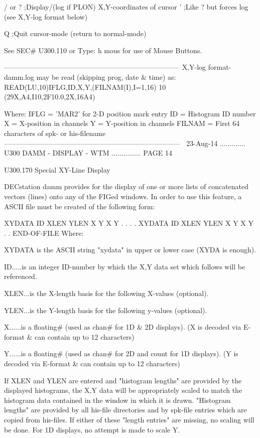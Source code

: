    / or ? ;Display/(log if PLON)  X,Y-coordinates of cursor
   '      ;Like ? but forces log (see X,Y-log format below)
 
   Q      ;Quit cursor-mode (return to normal-mode)
 
   See SEC# U300.110 or Type: h mous for use of Mouse Buttons.
 
   ---------------------------------------------------------------------------
   X,Y-log format- damm.log may be read (skipping prog, date & time) as:
          READ(LU,10)IFLG,ID,X,Y,(FILNAM(I),I=1,16)
       10 (29X,A4,I10,2F10.0,2X,16A4)
 
   Where: IFLG   = 'MAR2' for 2-D position mark entry
          ID     = Histogram ID number
          X      = X-position in channels
          Y      = Y-position in channels
          FILNAM = First 64 characters of spk- or his-filename
   ---------------------------------------------------------------------------
    
   23-Aug-14 ............. U300  DAMM - DISPLAY - WTM ............... PAGE  14
 
 
 
   U300.170  Special XY-Line Display
 
   DECstation  damm  provides  for  the  display  of  one  or  more  lists  of
   concatenated vectors (lines) onto any of the FIGed  windows.  In  order  to
   use this feature, a ASCII file must be created of the following form:
 
 
   XYDATA  ID  XLEN  YLEN
   X Y
   X Y
   . .
   . .
   XYDATA  ID  XLEN  YLEN
   X Y
   X Y
   . .
   END-OF-FILE     Where:
 
 
   XYDATA  is  the  ASCII  string  "xydata"  in  upper  or lower case (XYDA is
          enough).
 
   ID.....is an integer ID-number by which the  X,Y  data  set  which  follows
          will be referenced.
 
   XLEN...is the X-length basis for the following X-values (optional).
 
   YLEN...is the Y-length basis for the following y-values (optional).
 
   X......is a floating# (used as chan# for 1D & 2D displays).
          (X is decoded via E-format & can contain up to 12 characters)
 
   Y......is a floating# (used as chan# for 2D and count for 1D displays).
          (Y is decoded via E-format & can contain up to 12 characters)
 
 
   If  XLEN  and  YLEN are entered and "histogram lengths" are provided by the
   displayed histograms, the X,Y data will be appropriately  scaled  to  match
   the  histogram  data  contained  in  the  window  in  which  it  is  drawn.
   "Histogram lengths"  are  provided  by  all  his-file  directories  and  by
   spk-file  entries  which  are  copied  from  his-files.  If either of these
   "length entries" are missing, no scaling will be done. For 1D displays,  no
   attempt is made to scale Y.
 
